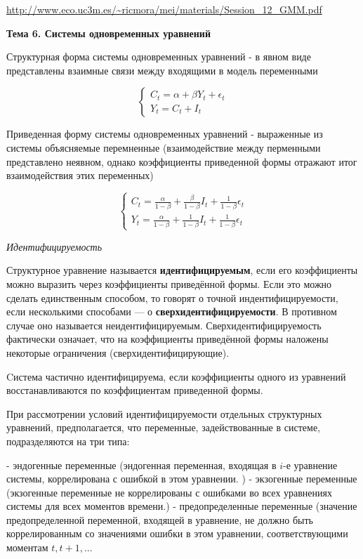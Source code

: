 \documentclass[a4paper,8pt]{article} %
\begin{document}
\url{http://www.eco.uc3m.es/~ricmora/mei/materials/Session_12_GMM.pdf}

\newpage

\textbf{Тема 6. Системы одновременных уравнений}


Структурная форма системы одновременных уравнений -  в явном виде представлены взаимные связи между
входящими в модель переменными

\begin{equation*} 
\begin{cases}
C_t = \alpha + \beta Y_t + \epsilon_t \\
Y_t = C_t + I_t 
\end{cases}
\end{equation*}


Приведенная форму системы одновременных уравнений - выраженные из системы объясняемые перемненные (взаимодействие между перменными  представлено неявном, однако коэффициенты приведенной формы отражают итог взаимодействия этих переменных)

\begin{equation*} 
\begin{cases}
C_t = \frac{\alpha}{1-\beta} + \frac{\beta}{1-\beta}  I_t +  \frac{1}{1-\beta} \epsilon_t \\
Y_t = \frac{\alpha}{1-\beta}  + \frac{1}{1-\beta} I_t + \frac{1}{1-\beta} \epsilon_t  
\end{cases}
\end{equation*}


\textit{Идентифицируемость}

Структурное уравнение называется \textbf{идентифицируемым}, если его коэффициенты можно выразить через коэффициенты приведённой формы. Если это можно сделать единственным способом, то говорят о точной индентифицируемости, если несколькими способами — о \textbf{сверхидентифицируемости}. В противном случае оно называется неидентифицируемым. Сверхидентифицируемость фактически означает, что на коэффициенты приведённой формы наложены некоторые ограничения (сверхидентифицирующие). 

Cистема частично идентифицируема, если коэффициенты одного из уравнений восстанавливаются по коэффициентам приведенной формы. 


При рассмотрении условий идентифицируемости отдельных структурных
уравнений, предполагается, что переменные, задействованные в системе, подразделяются на три типа: 

- эндогенные переменные (эндогенная переменная, входящая в $i$-е уравнение системы, коррелирована с ошибкой в этом уравнении. )
- экзогенные переменные (экзогенные переменные не коррелированы с ошибками во всех уравнениях системы для всех моментов времени.)
- предопределенные переменные  (значение предопределенной переменной, входящей в уравнение, не должно быть коррелированным со значениями ошибки в этом уравнении, соответствующими моментам  $t, t + 1,... $  
\end{document}
